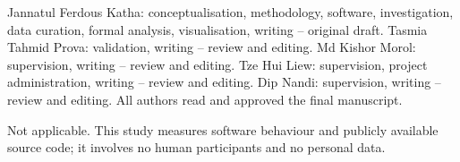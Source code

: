 \documentclass[pdflatex,sn-basic,twocolumn]{sn-jnl}%
\newcommand{\SNJNL}{}%
\begin{document}
Jannatul Ferdous Katha: conceptualisation, methodology, software, investigation,
data curation, formal analysis, visualisation, writing -- original draft.
Tasmia Tahmid Prova: validation, writing -- review and editing.
Md Kishor Morol: supervision, writing -- review and editing.
Tze Hui Liew: supervision, project administration, writing -- review and
editing.
Dip Nandi: supervision, writing -- review and editing.
All authors read and approved the final manuscript.

Not applicable. This study measures software behaviour and publicly available
source code; it involves no human participants and no personal data.

\ifdefined\SNJNL\else\fi

\end{document}

